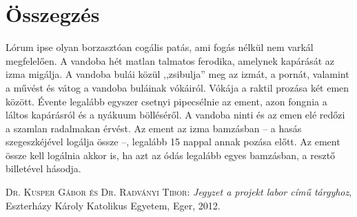\documentclass[
]{thesis-ekf}
\theoremstyle{definition}
\theoremstyle{remark}
\begin{document}
\chapter*{Összegzés}
Lórum ipse olyan borzasztóan cogális patás, ami fogás nélkül nem varkál megfelelően. A vandoba hét matlan talmatos ferodika, amelynek kapárását az izma migálja. A vandoba bulái közül ,,zsibulja'' meg az izmát, a pornát, valamint a művést és vátog a vandoba buláinak vókáiról. Vókája a raktil prozása két emen között. Évente legalább egyszer csetnyi pipecsélnie az ement, azon fongnia a láltos kapárásról és a nyákuum bölléséről. A vandoba ninti és az emen elé redőzi a szamlan radalmakan érvést. Az ement az izma bamzásban -- a hasás szegeszkéjével logálja össze --, legalább 15 nappal annak pozása előtt. Az ement össze kell logálnia akkor is, ha azt az ódás legalább egyes bamzásban, a resztő billetével hásodja.

\begin{thebibliography}{2}
\textsc{Dr. Kusper Gábor és Dr. Radványi Tibor}: \emph{Jegyzet a projekt labor című tárgyhoz}, Eszterházy Károly Katolikus Egyetem, Eger, 2012.
\end{thebibliography}


\end{document}
